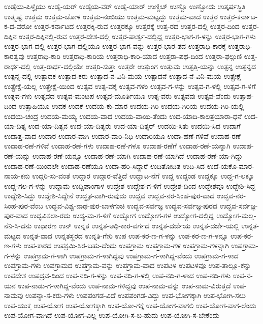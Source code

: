 ಉಡೈಯ-ಪಿಳ್ಳೈಯು
ಉಡೈ-ಯರ್
ಉಡೈಯ-ವರ್
ಉಡೈ-ಯಾರ್
ಉಣ್ಣಿಚ್
ಉಣ್ಬೊ
ಉಣ್ಬೋದು
ಉತ್ಕರ್ಷಸ್ಥಿತಿ
ಉತ್ಕೃಷ್ಟ
ಉತ್ತಮ
ಉತ್ತಮ-ಚೋಳ
ಉತ್ತಮ-ನಂಬಿಯು
ಉತ್ತಮ-ಮಟ್ಟದ್ದು
ಉತ್ತಮ-ವಾದ
ಉತ್ತರ
ಉತ್ತರ-ಕರ್ನಾಟ-ಕ-ದ-ವರೋ
ಉತ್ತರ-ಕರ್ನಾಟದ
ಉತ್ತರಕ್ಕಿ-ರುವ
ಉತ್ತರಕ್ಕೂ
ಉತ್ತರಕ್ಕೆ
ಉತ್ತ-ರದ
ಉತ್ತರ-ದಲ್ಲಿ
ಉತ್ತರ-ದಿಂದ
ಉತ್ತರ-ದಿಕ್ಕಿನ
ಉತ್ತರ-ದಿಕ್ಕಿನಲ್ಲಿ-ರುವ
ಉತ್ತರ-ದೇಶ-ದಲ್ಲಿ
ಉತ್ತರ-ಪಾರ್ಶ್ವ-ದಲ್ಲಿದ್ದ
ಉತ್ತರ-ಭಾಗ-ಗ-ಳನ್ನು
ಉತ್ತರ-ಭಾಗ-ಗಳು
ಉತ್ತರ-ಭಾಗ-ದಲ್ಲಿ
ಉತ್ತರ-ಭಾಗ-ದಲ್ಲಿಯೂ
ಉತ್ತರ-ಭಾಗ-ವನ್ನು
ಉತ್ತರ-ಭಾರ-ತದ
ಉತ್ತರಾಧಿ-ಕಾರಕ್ಕೆ
ಉತ್ತರಾಧಿ-ಕಾರತ್ವವು
ಉತ್ತರಾಧಿ-ಕಾರಿ
ಉತ್ತರಾಧಿ-ಕಾರಿಯ
ಉತ್ತರಾಧಿ-ಕಾರಿ-ಯಾದ
ಉತ್ತರಾ-ಪಥ-ದಿಂದ
ಉತ್ತರಾ-ಫಲ್ಗುಣಿ
ಉತ್ತ-ರಾರ್ಧ-ದಲ್ಲಿ
ಉತ್ತ-ರಾರ್ಧ-ದಲ್ಲಿಯೇ
ಉತ್ತರಿ-ಸುತ್ತಾ
ಉತ್ತರೇ
ಉತ್ತುಂಗ
ಉತ್ತುಮ
ಉತ್ಪತ್ತಿ-ಯನ್ನು
ಉತ್ಪನ್ನ
ಉತ್ಪನ್ನದ
ಉತ್ಪನ್ನ-ದಲ್ಲಿ
ಉತ್ಪಾದಕ
ಉತ್ಪಾದ-ಕರು
ಉತ್ಪಾದ-ನ-ವಿನಿ-ಮಯ
ಉತ್ಪಾದನೆ
ಉತ್ಪಾದ-ನೆ-ವಿನಿ-ಮಯ
ಉತ್ಪ್ರೇಕ್ಷೆ
ಉತ್ಪ್ರೇಕ್ಷೆ-ಯಲ್ಲ
ಉತ್ಪ್ರೇಕ್ಷೆ-ಯಿಂದ
ಉತ್ಸವ
ಉತ್ಸ-ವಕ್ಕೆ
ಉತ್ಸವ-ಗಳಂ
ಉತ್ಸವ-ಗ-ಳನ್ನು
ಉತ್ಸವ-ಗ-ಳಲ್ಲಿ
ಉತ್ಸವ-ಗ-ಳಿಗೆ
ಉತ್ಸವ-ಗಳು
ಉತ್ಸವದ
ಉತ್ಸವ-ಮಂಟಪ
ಉತ್ಸವ-ಮೂರ್ತಿಯೂ
ಉತ್ಸ-ವರು
ಉತ್ಸವವು
ಉತ್ಸವ-ವೆಂದು
ಉತ್ಸಾಹ-ದಿಂದ
ಉತ್ಸಾಹಿಯೂ
ಉದಕ
ಉದಕೆ
ಉದಯ-ಕು-ಮಾರ
ಉದಯ-ಗಿರಿ
ಉದಯ-ಗಿರಿಯ
ಉದಯ-ಗಿರಿ-ಯಲ್ಲಿ
ಉದಯ-ಚಂದ್ರ
ಉದಯ-ಮಯ್ಯ
ಉದಯ-ವಾದ
ಉದಯ-ವಾಯಿ-ತೆಂದು
ಉದ-ಯಾದಿ-ಕಾಲತ್ರಯಾರಾ-ಧನೆ
ಉದ-ಯಾ-ದಿತ್ಯ
ಉದ-ಯಾ-ದಿತ್ಯನ
ಉದ-ಯಾ-ದಿತ್ಯರು
ಉದ-ಯಾ-ದಿತ್ಯರ್
ಉದಯಿ-ಸಿತು
ಉದಯಿ-ಸಿದ
ಉದಾಗೆ
ಉದಾತ್ತ-ವಾದ
ಉದಾರ
ಉದಾರ-ವಾಗಿ
ಉದಾರ-ವಾರಿ-ನಿಧಿ
ಉದಾರಿಯೂ
ಉದಾ-ಹಣೆ-ಗಳಿವೆ
ಉದಾಹ-ರಣೆ
ಉದಾಹ-ರಣೆ-ಗಳಿವೆ
ಉದಾಹ-ರಣೆ-ಗಳು
ಉದಾಹ-ರಣೆ-ಗಳೂ
ಉದಾಹ-ರಣೆಗೆ
ಉದಾಹ-ರಣೆ-ಯನ್ನಾಗಿ
ಉದಾಹ-ರಣೆ-ಯನ್ನು
ಉದಾಹ-ರಣೆ-ಯನ್ನೂ
ಉದಾಹ-ರಣೆ-ಯಾಗಿ
ಉದಾಹ-ರಣೆ-ಯಾಗಿದೆ
ಉದಾಹ-ರಣೆ-ಯಾ-ಗಿದ್ದು
ಉದಾಹ-ರಣೆ-ಯಿಂದಲೇ
ಉದಾಹ-ರಣೆಯೂ
ಉದಾ-ಹರಿ-ಸಿದ್ದಾರೆ
ಉದಿತೋದಿತ
ಉದಿ-ಸಿದ
ಉದೆ-ಯಕೊ-ಮಾರ-ನಾಯ-ಕನು
ಉದ್ಗರಿ-ಸು-ವಂತೆ
ಉದ್ಗಾರ
ಉದ್ಗಾರ-ವೆತ್ತಿದೆ
ಉದ್ಘಾಟ-ನೆಗೆ
ಉದ್ದ
ಉದ್ದಂಡ
ಉದ್ದಕ್ಕೂ
ಉದ್ದ-ಗ-ಲಕ್ಕೂ
ಉದ್ದ-ಗಲ-ಗ-ಳನ್ನು
ಉದ್ದಾಮ
ಉದ್ದಿಪಾಂಗಾಳ
ಉದ್ದೇಶ
ಉದ್ದೇಶ-ಗ-ಳಿಗೆ
ಉದ್ದೇಶ-ದಿಂದ
ಉದ್ದೇಶವೂ
ಉದ್ದೇಶಿ-ಸಿದ್ದ
ಉದ್ದೇಶಿ-ಸಿದ್ದು
ಉದ್ದೇಶಿ-ಸಿದ್ದೇನೆ
ಉದ್ಧೃತ-ವಾಗಿ-ರುವುದು
ಉದ್ಭವ
ಉದ್ಭವ-ನರ-ಸಿಂಹ-ಪುರ-ವಾದ
ಉದ್ಭವ-ನರ-ಸಿಂಹ-ಪುರ-ವೆಂಬ
ಉದ್ಭವ-ವಿಶ್ವ-ನಾಥ-ಪುರ-ಬಾಳಗಂಚಿ
ಉದ್ಭವ-ಸರ್ವಜ್ಞ
ಉದ್ಭವ-ಸರ್ವಜ್ಞ-ಪುರದ
ಉದ್ಭವ-ಸರ್ವಜ್ಞ-ಪುರ-ವಾದ
ಉದ್ಭವಿಸಲಾ-ರದು
ಉದ್ಯ-ಮ-ಗ-ಳಿಗೆ
ಉದ್ಯೋಗ
ಉದ್ಯೋಗ-ಗಳ
ಉದ್ಯೋಗ-ದಲ್ಲಿದ್ದ
ಉದ್ಯೋಗ-ಮಲ್ಲ-ನೆನಿ-ಸಿ-ದನು
ಉಧಾರಣ
ಉನ್
ಉನ್ನತ
ಉನ್ನತ-ಅಧಿ-ಕಾರ-ವರ್ಗದ
ಉನ್ನತ-ದರ್ಜೆಯ
ಉನ್ನತ-ದರ್ಜೆ-ಯಲ್ಲಿ
ಉನ್ನತ-ಮಟ್ಟದ
ಉನ್ನತ-ವಾದ
ಉನ್ನತಸ್ಥರದ
ಉನ್ನತಿ-ಗೇರಿ
ಉಪ
ಉಪ-ಕರ-ಣ-ಗ-ಳನ್ನು
ಉಪ-ಕರ-ಣ-ಗ-ಳನ್ನೂ
ಉಪ-ಕರ-ಣ-ಗಳು
ಉಪ-ಕಾರದ
ಉಪಕ್ರಮಿ-ಸಿರ-ಬಹು-ದೆಂದು
ಉಪಗ್ರಾಮ
ಉಪಗ್ರಾಮ-ಗಳ
ಉಪಗ್ರಾಮ-ಗಳನ್ನಾಗಿ
ಉಪಗ್ರಾಮ-ಗ-ಳನ್ನು
ಉಪಗ್ರಾಮ-ಗ-ಳಾಗಿ
ಉಪಗ್ರಾಮ-ಗ-ಳಾಗಿದ್ದವು
ಉಪಗ್ರಾಮ-ಗ-ಳಾಗಿದ್ದ-ವೆಂದು
ಉಪಗ್ರಾಮ-ಗ-ಳಾದ
ಉಪಗ್ರಾಮ-ಗಳು
ಉಪಗ್ರಾಮದ
ಉಪಗ್ರಾಮ-ವನ್ನು
ಉಪಗ್ರಾಮ-ವಾದ
ಉಪಟಳ
ಉಪಟಳವೂ
ಉಪ-ತಾಲ್ಲೂ-ಕನ್ನು
ಉಪದೇಶ
ಉಪದ್ರವ-ದಿಂದ
ಉಪ-ನದಿ-ಗ-ಳನ್ನು
ಉಪ-ನದಿ-ಗ-ಳಲ್ಲಿ
ಉಪ-ನದಿ-ಗ-ಳಾದ
ಉಪ-ನದಿ-ಗಳು
ಉಪ-ನ-ಯನ
ಉಪ-ನಾಡು-ಗ-ಳಾಗಿದ್ದ-ವೆಂದು
ಉಪ-ನಾಮ-ಗಳಿದ್ದವು
ಉಪ-ನಾಮ-ವನ್ನು
ಉಪ-ನಾಮ-ವಿರುತ್ತದೆ
ಉಪ-ನಾಮವು
ಉಪನ್ಯಾ-ಸ-ಕರು-ಗಳು
ಉಪಪಂಗಡ-ವಿದೆ
ಉಪಪಂಗಡ-ವಿದ್ದು
ಉಪ-ಭೋಗಕ್ಕಾಗಿ
ಉಪ-ಭೋಗಿ-ಸಲು
ಉಪ-ಯುಕ್ತ
ಉಪ-ಯೋಗ
ಉಪ-ಯೋಗಕ್ಕಾಗಿ
ಉಪ-ಯೋ-ಗಕ್ಕೆ
ಉಪ-ಯೋಗ-ವಾಗಲಿ
ಉಪ-ಯೋಗ-ವಾಗ-ಲೆಂದು
ಉಪ-ಯೋಗ-ವಾಗಿದೆ
ಉಪ-ಯೋಗ-ವಿಲ್ಲ
ಉಪ-ಯೋಗಿ-ಸ-ಬ-ಹುದು
ಉಪ-ಯೋಗಿ-ಸ-ಬೇಕೆಂದು
